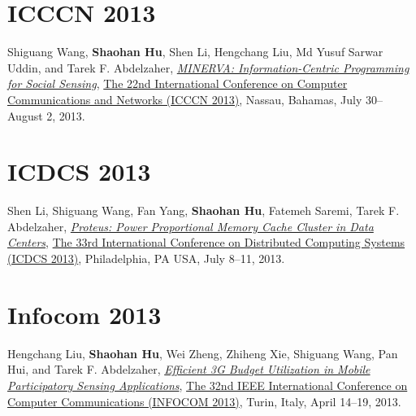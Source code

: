 
\section{\sc ICCCN 2013}\hypertarget{wang2013icccn}{}
Shiguang Wang, \textbf{Shaohan Hu}, Shen Li, Hengchang Liu, Md Yusuf Sarwar Uddin, and Tarek F. Abdelzaher,
\href{http://ieeexplore.ieee.org/document/6614152}{\emph{MINERVA: Information-Centric Programming for Social Sensing}},
\href{http://www.icccn.org/icccn13/}{\textsf{The 22nd International Conference on Computer Communications and Networks (ICCCN 2013)}},
Nassau, Bahamas, July 30--August 2, 2013.

\section{\sc ICDCS 2013}\hypertarget{li2013icdcs}{}
Shen Li, Shiguang Wang, Fan Yang, \textbf{Shaohan Hu}, Fatemeh Saremi, Tarek F. Abdelzaher,
\href{http://ieeexplore.ieee.org/document/6681577}{\emph{Proteus: Power Proportional Memory Cache Cluster in Data Centers}},
\href{http://www.temple.edu/cis/icdcs2013/}{\textsf{The 33rd International Conference on Distributed Computing Systems (ICDCS 2013)}},
Philadelphia, PA USA, July 8--11, 2013.


\section{\sc Infocom 2013}\hypertarget{liu2013infocom}{}
Hengchang Liu, \textbf{Shaohan Hu}, Wei Zheng, Zhiheng Xie, Shiguang Wang, Pan Hui, and Tarek F. Abdelzaher,
\href{http://ieeexplore.ieee.org/document/6566935}{\emph{Efficient 3G Budget Utilization in Mobile Participatory Sensing Applications}},
\href{http://infocom2013.ieee-infocom.org/}{\textsf{The 32nd IEEE International Conference on Computer Communications (INFOCOM 2013)}},
Turin, Italy, April 14--19, 2013.

